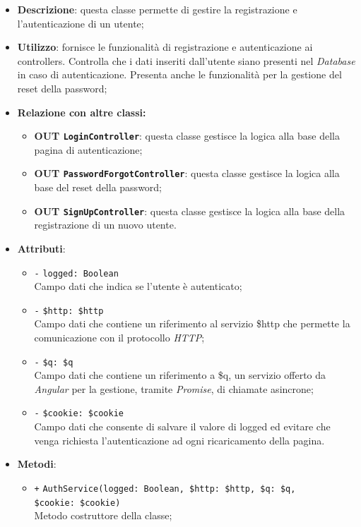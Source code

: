 \begin{itemize}
	\item \textbf{Descrizione}: questa classe permette di gestire la registrazione e l'autenticazione di un utente;
	\item \textbf{Utilizzo}: fornisce le funzionalità di registrazione e autenticazione ai controllers. Controlla che i dati inseriti dall'utente siano presenti nel \textit{Database} in caso di autenticazione. Presenta anche le funzionalità per la gestione del reset della password;
	\item \textbf{Relazione con altre classi:}
	\begin{itemize}
		\item \textbf{OUT \texttt{LoginController}}: questa classe gestisce la logica alla base della pagina di autenticazione;
		\item \textbf{OUT \texttt{PasswordForgotController}}: questa classe gestisce la logica alla base del reset della password;
		\item \textbf{OUT \texttt{SignUpController}}: questa classe gestisce la logica alla base della registrazione di un nuovo utente.
	\end{itemize}
	\item \textbf{Attributi}:
	\begin{itemize}
		\item \texttt{-} \texttt{logged: Boolean} \\ Campo dati che indica se l'utente è autenticato;
		\item \texttt{-} \texttt{\$http: \$http} \\ Campo dati che contiene un riferimento al servizio \$http che permette la comunicazione con il protocollo \textit{HTTP};
		\item \texttt{-} \texttt{\$q: \$q} \\ Campo dati che contiene un riferimento a \$q, un servizio offerto da \textit{Angular} per la gestione, tramite \textit{Promise}, di chiamate asincrone;
		\item \texttt{-} \texttt{\$cookie: \$cookie} \\ Campo dati che consente di salvare il valore di logged ed evitare che venga richiesta l'autenticazione ad ogni ricaricamento della pagina.
	\end{itemize}
	\item \textbf{Metodi}:
	\begin{itemize}
		\item \texttt{+} \texttt{AuthService(logged: Boolean, \$http: \$http, \$q: \$q, \\ \$cookie: \$cookie)} \\ Metodo costruttore della classe; \\

\end{itemize}
\end{itemize}
